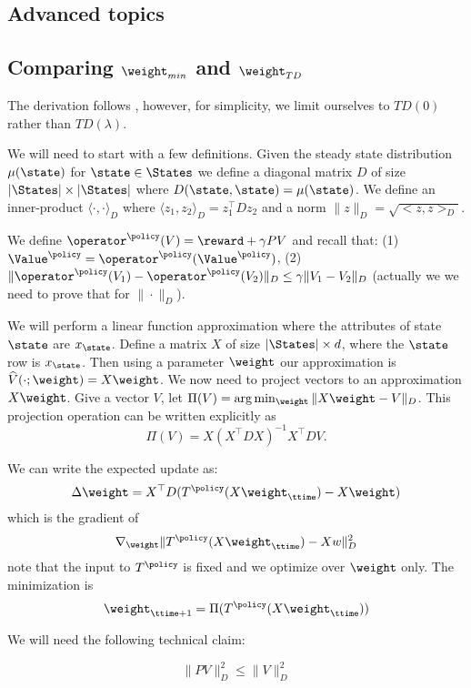 \begin{leftbar}
\section{Advanced topics}
\label{sec:FA-Advanced}

\subsection{Comparing $\weight_{min}$ and $\weight_{TD}$}

The derivation follows \cite{TsitsiklisVR97}, however, for
simplicity, we limit ourselves to $TD(0)$ rather than $TD(\lambda)$.

We will need to start with a few definitions. Given the steady state
distribution $\mu(\state)$ for $\state\in \States$ we define a
diagonal matrix $D$ of size $|\States|\times|\States|$ where
$D(\state,\state)=\mu(\state)$. We define an inner-product
$\langle\cdot,\cdot\rangle_D$ where $\langle
z_1,z_2\rangle_D=z_1^\top Dz_2$ and a norm $\|z\|_D=\sqrt{<z,z>_D}$.

We define $\operator^\policy(V)= \reward + \gamma PV$ and recall
that: (1) $\Value^\policy = \operator^\policy(\Value^\policy)$, (2)
$\|\operator^\policy(V_1)-\operator^\policy(V_2)\|_D\leq \gamma
\|V_1-V_2\|_D$ (actually we we need to prove that for
$\|\cdot\|_D$).

We will perform a linear function approximation where the attributes
of state $\state$ are $x_\state$. Define a matrix $X$ of size
$|\States|\times d$, where the $\state$ row is $x_\state$. Then
using a parameter $\weight$ our approximation is
$\widehat{V}(\cdot;\weight)=X\weight$. We now need to project
vectors to an approximation $X\weight$. Give a vector $V$, let
$\Pi(V)=\arg\min_\weight \|X\weight-V\|_D$. This projection
operation can be written explicitly as
\[
\Pi(V)=X(X^\top DX)^{-1}X^\top D V.
\]


We can write the expected update as:
\[
\Delta \weight= X^\top D(T^\policy(X\weight_\ttime)-X\weight)
\]
which is the gradient of
\[
\nabla_\weight \|T^\policy(X\weight_\ttime)-Xw\|_D^2
\]
note that the input to $T^\policy$ is fixed and we optimize over
$\weight$ only. The minimization is
\[
\weight_{\ttime+1}=\Pi(T^\policy(X\weight_\ttime))
\]

We will need the following technical claim:
\begin{claim}
\[
\|PV\|_D^2\leq \|V\|_D^2
\]
\end{claim}


\end{leftbar}
